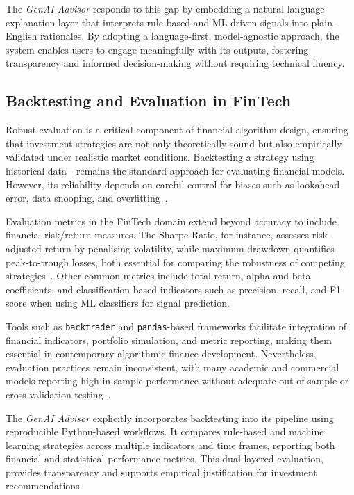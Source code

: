 The \textit{GenAI Advisor} responds to this gap by embedding a natural language explanation layer that interprets rule-based and ML-driven signals into plain-English rationales. By adopting a language-first, model-agnostic approach, the system enables users to engage meaningfully with its outputs, fostering transparency and informed decision-making without requiring technical fluency.

\subsection{Backtesting and Evaluation in FinTech}

Robust evaluation is a critical component of financial algorithm design, ensuring that investment strategies are not only theoretically sound but also empirically validated under realistic market conditions. Backtesting a strategy using historical data—remains the standard approach for evaluating financial models. However, its reliability depends on careful control for biases such as lookahead error, data snooping, and overfitting~\cite{bailey2014backtest}.

Evaluation metrics in the FinTech domain extend beyond accuracy to include financial risk/return measures. The Sharpe Ratio, for instance, assesses risk-adjusted return by penalising volatility, while maximum drawdown quantifies peak-to-trough losses, both essential for comparing the robustness of competing strategies~\cite{lo2002sharpe}. Other common metrics include total return, alpha and beta coefficients, and classification-based indicators such as precision, recall, and F1-score when using ML classifiers for signal prediction.

Tools such as \texttt{backtrader} and \texttt{pandas}-based frameworks facilitate integration of financial indicators, portfolio simulation, and metric reporting, making them essential in contemporary algorithmic finance development. Nevertheless, evaluation practices remain inconsistent, with many academic and commercial models reporting high in-sample performance without adequate out-of-sample or cross-validation testing~\cite{kaastra1996forecasting}.

The \textit{GenAI Advisor} explicitly incorporates backtesting into its pipeline using reproducible Python-based workflows. It compares rule-based and machine learning strategies across multiple indicators and time frames, reporting both financial and statistical performance metrics. This dual-layered evaluation, provides transparency and supports empirical justification for investment recommendations.

